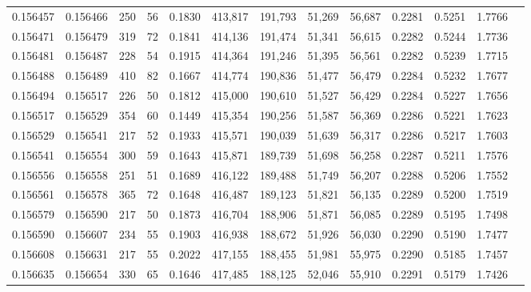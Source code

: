 \begin{tabular}{rrrrrrrrrrrrr}
0.156457 & 0.156466 &   250 &  56 &                                     0.1830 & 413,817 & 191,793 &  51,269 &  56,687 & 0.2281 & 0.5251 & 1.7766 \\
0.156471 & 0.156479 &   319 &  72 &                                     0.1841 & 414,136 & 191,474 &  51,341 &  56,615 & 0.2282 & 0.5244 & 1.7736 \\
0.156481 & 0.156487 &   228 &  54 &                                     0.1915 & 414,364 & 191,246 &  51,395 &  56,561 & 0.2282 & 0.5239 & 1.7715 \\
0.156488 & 0.156489 &   410 &  82 &                                     0.1667 & 414,774 & 190,836 &  51,477 &  56,479 & 0.2284 & 0.5232 & 1.7677 \\
0.156494 & 0.156517 &   226 &  50 &                                     0.1812 & 415,000 & 190,610 &  51,527 &  56,429 & 0.2284 & 0.5227 & 1.7656 \\
0.156517 & 0.156529 &   354 &  60 &                                     0.1449 & 415,354 & 190,256 &  51,587 &  56,369 & 0.2286 & 0.5221 & 1.7623 \\
0.156529 & 0.156541 &   217 &  52 &                                     0.1933 & 415,571 & 190,039 &  51,639 &  56,317 & 0.2286 & 0.5217 & 1.7603 \\
0.156541 & 0.156554 &   300 &  59 &                                     0.1643 & 415,871 & 189,739 &  51,698 &  56,258 & 0.2287 & 0.5211 & 1.7576 \\
0.156556 & 0.156558 &   251 &  51 &                                     0.1689 & 416,122 & 189,488 &  51,749 &  56,207 & 0.2288 & 0.5206 & 1.7552 \\
0.156561 & 0.156578 &   365 &  72 &                                     0.1648 & 416,487 & 189,123 &  51,821 &  56,135 & 0.2289 & 0.5200 & 1.7519 \\
0.156579 & 0.156590 &   217 &  50 &                                     0.1873 & 416,704 & 188,906 &  51,871 &  56,085 & 0.2289 & 0.5195 & 1.7498 \\
0.156590 & 0.156607 &   234 &  55 &                                     0.1903 & 416,938 & 188,672 &  51,926 &  56,030 & 0.2290 & 0.5190 & 1.7477 \\
0.156608 & 0.156631 &   217 &  55 &                                     0.2022 & 417,155 & 188,455 &  51,981 &  55,975 & 0.2290 & 0.5185 & 1.7457 \\
0.156635 & 0.156654 &   330 &  65 &                                     0.1646 & 417,485 & 188,125 &  52,046 &  55,910 & 0.2291 & 0.5179 & 1.7426 \\

\end{tabular}
